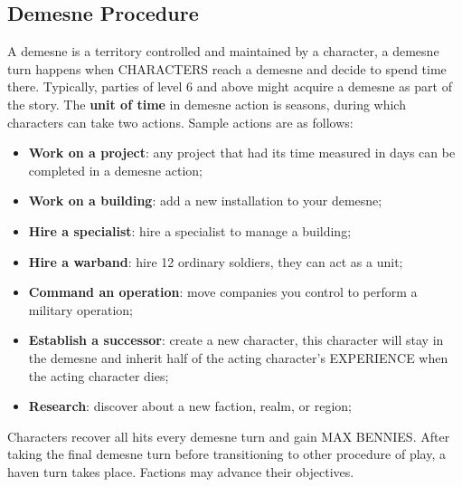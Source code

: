 \subsection{Demesne Procedure}
A demesne is a territory controlled and maintained by a character, a demesne turn happens when CHARACTERS reach a demesne and decide to spend time there. Typically, parties of level 6 and above might acquire a demesne as part of the story. The \textbf{unit of time} in demesne action is seasons, during which characters can take two actions. Sample actions are as follows:
\begin{itemize}
    \item {\textbf{Work on a project}: any project that had its time measured in days can be completed in a demesne action;}
    \item {\textbf{Work on a building}: add a new installation to your demesne;}
    \item {\textbf{Hire a specialist}: hire a specialist to manage a building;}
    \item {\textbf{Hire a warband}: hire 12 ordinary soldiers, they can act as a unit;}
    \item {\textbf{Command an operation}: move companies you control to perform a military operation;}
    \item {\textbf{Establish a successor}: create a new character, this character will stay in the demesne and inherit half of the acting character's EXPERIENCE when the acting character dies;}
    \item {\textbf{Research}: discover about a new faction, realm, or region;}
\end{itemize}
Characters recover all hits every demesne turn and gain MAX BENNIES. After taking the final demesne turn before transitioning to other procedure of play, a haven turn takes place. Factions may advance their objectives.

